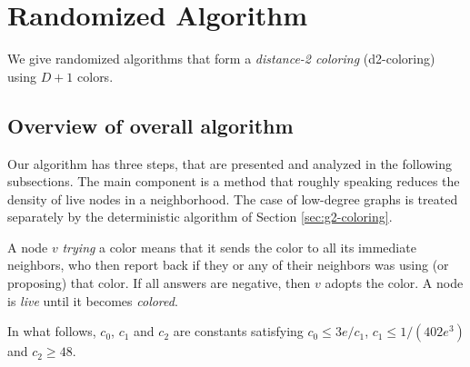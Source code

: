 
\section{Randomized Algorithm}
\label{sec:randAlg}
We give randomized {\congest} algorithms that form a \emph{distance-2 coloring} (d2-coloring) using $D+1$ colors.

\subsection{Overview of overall algorithm }

Our algorithm has three steps, that are presented and analyzed in the following subsections.
The main component is a method  that roughly speaking reduces the density of live nodes in a neighborhood. The case of low-degree graphs is treated separately by the deterministic algorithm of Section \ref{sec:g2-coloring}.

A node $v$ \emph{trying} a color means that it sends the color to all its immediate neighbors, who then report back if they or any of their neighbors was using (or proposing) that color.
If all answers are negative, then $v$ adopts the color. A node is \emph{live} until it becomes \emph{colored}.

In what follows, $c_0$, $c_1$ and $c_2$ are constants satisfying $c_0 \le 3e/c_1$, $c_1 \le 1/(402 e^3)$ and $c_2 \ge 48$.

